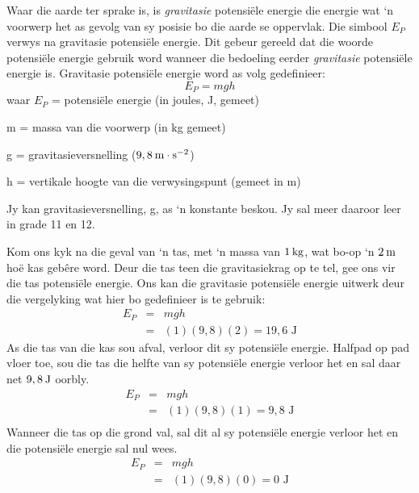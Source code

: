       \label{m38784*id66167}Waar die aarde ter sprake is, is \textsl{gravitasie} potensi\"{e}le energie die energie wat ‘n voorwerp het as gevolg van sy posisie bo die aarde se oppervlak. Die simbool ${E}_{P}$ verwys na gravitasie potensiële energie. Dit gebeur gereeld dat die woorde potensiële energie gebruik word wanneer die bedoeling eerder \textsl{gravitasie} potensiële energie is. Gravitasie potensi\"{e}le energie word as volg gedefinieer:\\
      \label{m38784*uid45}\nopagebreak\noindent{}
    \begin{equation}
    {E}_{P}=mgh
      \end{equation}
      \label{m38784*id66223}waar
${E}_{P}$ = potensi\"{e}le energie (in joules, J, gemeet)\par 
      \label{m38784*id66229}m = massa van die voorwerp (in kg gemeet)\par 
      \label{m38784*id66234}g = gravitasieversnelling ($9,8\phantom{\rule{2pt}{0ex}}\text{m}\ensuremath{\cdot}\text{s}{}^{-2}$)\par 
      \label{m38784*id66266}h = vertikale hoogte van die verwysingspunt (gemeet in m)\par 
      \label{m38784*eip-306}

Jy kan gravitasieversnelling, g, as ‘n konstante beskou. Jy sal meer daaroor leer in grade 11 en 12. 


Kom ons kyk na die geval van ‘n tas, met ‘n massa van $1\phantom{\rule{2pt}{0ex}}\text{kg}$, wat bo-op ‘n $2\phantom{\rule{2pt}{0ex}}\text{m}$ ho\"{e} kas geb\^{e}re word. Deur die tas teen die gravitasiekrag op te tel, gee ons vir die tas potensi\"{e}le energie. Ons kan die gravitasie potensi\"{e}le energie uitwerk deur die vergelyking wat hier bo gedefinieer is te gebruik:
\begin{eqnarray*}
E_{P} & = & mgh \\
& = & (1)(9,8)(2) = 19,6 \text{ J}
\end{eqnarray*}
As die tas van die kas sou afval, verloor dit sy potensiële energie. Halfpad op pad vloer toe, sou die tas die helfte van sy potensiële energie verloor het en sal daar net $9,8\phantom{\rule{2pt}{0ex}}\text{J}$ oorbly. 
\begin{eqnarray*}
E_{P} & = & mgh \\
& = & (1)(9,8)(1) = 9,8 \text{ J} \\
\end{eqnarray*}
Wanneer die tas op die grond val, sal dit al sy potensi\"{e}le energie verloor het en die potensi\"{e}le energie sal nul wees.
\begin{eqnarray*}
E_{P} & = & mgh \\
& = & (1)(9,8)(0) = 0 \text{ J} \\
\end{eqnarray*}

